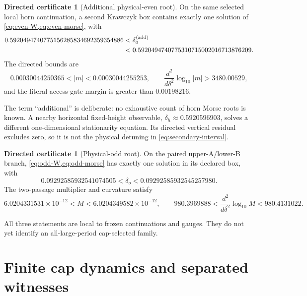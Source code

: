 \documentclass[11pt]{article}
\theoremstyle{definition}
\newtheorem{certificate}[theorem]{Directed certificate}
\theoremstyle{remark}
\begin{document}
\begin{certificate}[Additional physical-even root]\label{cert:secondary}
On the same selected local horn continuation, a second Krawczyk box contains exactly one solution of \cref{eq:even-W,eq:even-morse}, with
\begin{equation}
\begin{split}
0.5920494740775156285834692359354886
&<\delta_0^{\rm(add)}\\
&<0.5920494740775310715002016713876209.
\end{split}
\label{eq:secondary-interval}
\end{equation}
The directed bounds are
\begin{equation}
  0.00030044250365<|m|<0.00030044255253,
  \qquad
  \frac{d^2}{d\delta^2}\log_{10}|m|>3480.00529,
  \label{eq:secondary-bounds}
\end{equation}
and the literal access-gate margin is greater than $0.00198216$.
\end{certificate}

The term ``additional'' is deliberate: no exhaustive count of horn Morse roots is known.  A nearby horizontal fixed-height observable, $\delta_h\approx0.5920596903$, solves a different one-dimensional stationarity equation.  Its directed vertical residual excludes zero, so it is not the physical detuning in \cref{eq:secondary-interval}.

\begin{certificate}[Physical-odd root]\label{cert:odd}
On the paired upper-A/lower-B branch, \cref{eq:odd-W,eq:odd-morse} has exactly one solution in its declared box, with
\begin{equation}
  0.09292585932541074505
  <\delta_o<
  0.09292585932545257980.
  \label{eq:odd-interval}
\end{equation}
The two-passage multiplier and curvature satisfy
\begin{equation}
  6.0204331531\times10^{-12}<M<6.0204349582\times10^{-12},
  \qquad
  980.3969888<\frac{d^2}{d\delta^2}\log_{10}M<980.4131022.
  \label{eq:odd-bounds}
\end{equation}
\end{certificate}

All three statements are local to frozen continuations and gauges.  They do not yet identify an all-large-period cap-selected family.

\section{Finite cap dynamics and separated witnesses}
\end{document}
